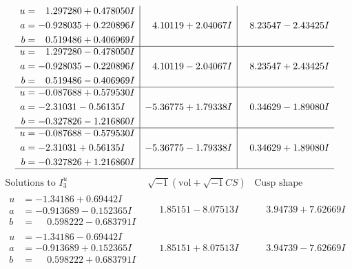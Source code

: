 \documentclass[1p]{elsarticle_modified}
\theoremstyle{definition}
\newcommand{\I}{\sqrt{-1}}
\begin{document}
$$\begin{array}{c|c|c}
\begin{aligned}
u &= \phantom{-}1.297280 + 0.478050 I \\
a &= -0.928035 + 0.220896 I \\
b &= \phantom{-}0.519486 + 0.406969 I\end{aligned}
 & \phantom{-}4.10119 + 2.04067 I & \phantom{-}8.23547 - 2.43425 I \\ \hline\begin{aligned}
u &= \phantom{-}1.297280 - 0.478050 I \\
a &= -0.928035 - 0.220896 I \\
b &= \phantom{-}0.519486 - 0.406969 I\end{aligned}
 & \phantom{-}4.10119 - 2.04067 I & \phantom{-}8.23547 + 2.43425 I \\ \hline\begin{aligned}
u &= -0.087688 + 0.579530 I \\
a &= -2.31031 - 0.56135 I \\
b &= -0.327826 - 1.216860 I\end{aligned}
 & -5.36775 + 1.79338 I & \phantom{-}0.34629 - 1.89080 I \\ \hline\begin{aligned}
u &= -0.087688 - 0.579530 I \\
a &= -2.31031 + 0.56135 I \\
b &= -0.327826 + 1.216860 I\end{aligned}
 & -5.36775 - 1.79338 I & \phantom{-}0.34629 + 1.89080 I\\
 \hline 
 \end{array}$$\newpage$$\begin{array}{c|c|c}  
\text{Solutions to }I^u_{3}& \I (\text{vol} + \sqrt{-1}CS) & \text{Cusp shape}\\
 \hline 
\begin{aligned}
u &= -1.34186 + 0.69442 I \\
a &= -0.913689 - 0.152365 I \\
b &= \phantom{-}0.598222 - 0.683791 I\end{aligned}
 & \phantom{-}1.85151 - 8.07513 I & \phantom{-}3.94739 + 7.62669 I \\ \hline\begin{aligned}
u &= -1.34186 - 0.69442 I \\
a &= -0.913689 + 0.152365 I \\
b &= \phantom{-}0.598222 + 0.683791 I\end{aligned}
 & \phantom{-}1.85151 + 8.07513 I & \phantom{-}3.94739 - 7.62669 I \\ \hline\begin{aligned}

\end{aligned}
\end{array}$$
\end{document}
